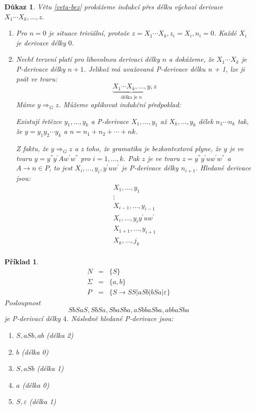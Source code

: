 \documentclass[10pt, a4paper, titlepage]{article}
\theoremstyle{note}
\newtheorem{dukaz}{Důkaz}
\newtheorem{priklad}{Příklad}
\begin{document}
\begin{dukaz}
Větu \ref{veta-bez} prokážeme indukcí přes délku výchozí derivace $X_{1} \cdots X_{k}, \ldots, z$.
\begin{enumerate}
\item
Pro $n = 0$ je situace triviální, protože $z = X_{1} \cdots X_{k}, z_{i} = X_{i}, n_{i} = 0$. Každé $X_{i}$ je derivace délky $0$.

\item
Nechť tvrzení platí pro libovolnou derivaci délky $n$ a dokážeme, že $X_{1} \cdots X_{k}$ je P-derivace délky $n + 1$.
Jelikož má uvažovaná P-derivace délku n + 1, lze ji psát ve tvaru:
$$
\underbrace {X_{1} \cdots X_{k}, \ldots, y}_{\text{délka je } n}, z
$$
Máme $y \Rightarrow_{G}z$. Můžeme aplikovat indukční předpoklad:

Existují řetězce $y_{1}, \ldots, y_{k}$ a P-derivace $X_{1}, \ldots, y_{1}$ až $X_{k}, \ldots, y_{k}$ 
délek $n_{1} \cdots n_{k}$ tak, že $y = y_{1} y_{2} \cdots y_{k}$ a $n = n_{1} + n_{2} + \cdots + n{k}$. 

Z faktu, že $y  \Rightarrow_{G}z$ a z toho, že gramatika je bezkontextová plyne, že $y$ je ve tvaru 
$y = y^{''} y^{'} A w^{'} w^{''}$ pro $i = 1, \ldots, k$. Pak $z$ je ve tvaru $z = y^{''} y^{'} u w^{'} w^{''}$ a $A \rightarrow n \in P$,
to jest $X_{i}, \ldots, y_{i}, y^{'} u w^{'}$ je P-derivace délky $n_{i+1}$. Hledané derivace jsou:
\begin{gather*}
X_{1}, \ldots, y_{1} \\
\vdots \\
X_{i-1}, \ldots, y_{i-1} \\
X_{i}, \ldots, y_{i} y^{'} u w^{'} \\
X_{1+1}, \ldots, y_{i+1} \\
X_{k}, \ldots, j_{k} \\ %
\end{gather*}
\end{enumerate}
\end{dukaz}

\begin{priklad}
\begin{eqnarray*}
N &=& \lbrace S \rbrace \\
\Sigma &=& \lbrace a, b \rbrace \\
P &=& \lbrace S \rightarrow SS|aSb|bSa| \varepsilon \rbrace
\end{eqnarray*}
Posloupnost
$$
SbSaS, SbSa, SbaSba, aSbbaSba , abbaSba
$$
je P-derivací délky $4$.
Následně hledané P-derivace jsou:
\begin{enumerate}
\item
$S, aSb, ab$ (délka 2)
\item
$b$ (délka 0)
\item
$S, aSb$ (délka 1)
\item
$a$ (délka 0)
\item
$S, \varepsilon $ (délka 1)
\end{enumerate}
\end{priklad}
\end{document}
